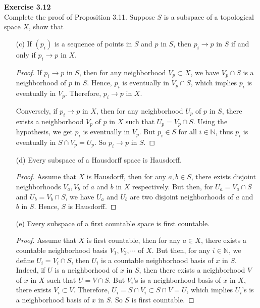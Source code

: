 \documentclass[12pt, a4paper]{article}
\theoremstyle{plain}
\newcommand{\N}{\mathbb{N}}
\newenvironment{exercise}[2][Exercise]
    { \begin{mdframed}[backgroundcolor=gray!20] \textbf{#1 #2} \\}
    {  \end{mdframed}}
\begin{document}
\begin{exercise}{3.12}
Complete the proof of Proposition 3.11. Suppose $S$ is a subspace of a topological space $X$, show that
\begin{enumerate}
\item[(c)] If $(p_i)$ is a sequence of points in $S$ and $p$ in $S$, then $p_i\rightarrow p$ in $S$ if and only if $p_i\rightarrow p$ in $X$.
	\begin{proof}
	If $p_i\rightarrow p$ in $S$, then for any neighborhood $V_p\subset X$, we have $V_p\cap S$ is a neighborhood of $p$ in $S$. Hence, $p_i$ is eventually in $V_p\cap S$, which implies $p_i$ is eventually in $V_p$. Therefore, $p_i\rightarrow p$ in $X$. 
	
	Conversely, if $p_i\rightarrow p$ in $X$, then for any neighborhood $U_p$ of $p$ in $S$, there exists a neighborhood $V_p$ of $p$ in $X$ such that $U_p=V_p\cap S$. Using the hypothesis, we get $p_i$ is eventually in $V_p$. But $p_i\in S$ for all $i\in\N$, thus $p_i$ is eventually in $S\cap V_p=U_p$. So $p_i\rightarrow p$ in $S$. 
	\end{proof}

\item[(d)] Every subspace of a Hausdorff space is Hausdorff.
	\begin{proof}
	Assume that $X$ is Hausdorff, then for any $a,b\in S$, there exists disjoint neighborhoods $V_a,V_b$ of $a$ and $b$ in $X$ respectively. But then, for $U_a=V_a\cap S$ and $U_b=V_b\cap S$, we have $U_a$ and $U_b$ are two disjoint neighborhoods of $a$ and $b$ in $S$. Hence, $S$ is Hausdorff.
	\end{proof}
	
\item[(e)] Every subspace of a first countable space is first countable.
	\begin{proof}
	Assume that $X$ is first countable, then for any $a\in X$, there exists a countable neighborhood basis $V_1,V_2,\cdots$ of $X$. But then, for any $i\in \N$, we define $U_i=V_i\cap S$, then $U_i$ is a countable neighborhood basis of $x$ in $S$. Indeed, if $U$ is a neighborhood of $x$ in $S$, then there exists a neighborhood $V$ of $x$ in $X$ such that $U=V\cap S$. But $V_i$'s is a neighborhood basis of $x$ in $X$, there exists $V_i\subset V$. Therefore, $U_i=S\cap V_i\subset S\cap V=U$, which implies $U_i$'s is a neighborhood basis of $x$ in $S$. So $S$ is first countable.
	\end{proof}
	

\end{enumerate}
\end{exercise}
\end{document}
